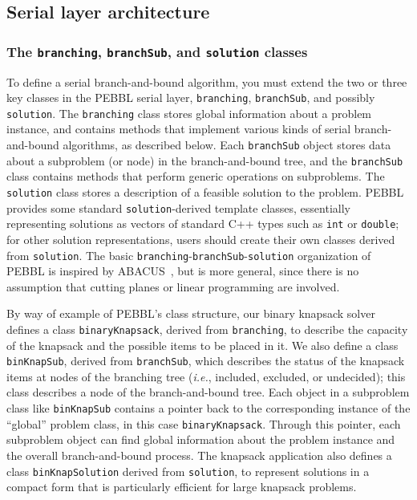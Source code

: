 \subsection{Serial layer architecture}

\subsubsection{The \texttt{branching}, \texttt{branchSub}, 
               and \texttt{solution} classes}

To define a serial branch-and-bound algorithm, you must extend the two
or three key classes in the PEBBL serial layer, \texttt{branching},
\texttt{branchSub}, and possibly \texttt{solution}.  The
\texttt{branching} class stores global information about a problem
instance, and contains methods that implement various kinds of serial
branch-and-bound algorithms, as described below.  Each
\texttt{branchSub} object stores data about a subproblem (or node) in the
branch-and-bound tree, and the \texttt{branchSub} class contains
methods that perform generic operations on subproblems.  The
\texttt{solution} class stores a description of a feasible solution to
the problem.  PEBBL provides some standard \texttt{solution}-derived
template classes, essentially representing solutions as vectors of
standard C++ types such as \texttt{int} or \texttt{double}; for other
solution representations, users should create their own classes
derived from \texttt{solution}.  The basic
\texttt{branching}-\texttt{branchSub}-\texttt{solution} organization
of PEBBL is inspired by ABACUS~\cite{JT98}, but is more general, since
there is no assumption that cutting planes or linear programming are
involved.

By way of example of PEBBL's class structure,
our binary knapsack solver defines a class 
\texttt{binaryKnapsack}, derived from \texttt{branching}, to describe the
capacity of the knapsack and the possible items to be placed in it. We
also define a class \texttt{binKnapSub}, derived from
\texttt{branchSub}, which describes the status of the knapsack items
at nodes of the branching tree (\emph{i.e.}, included, excluded, or
undecided); this class describes a node of the branch-and-bound tree.
Each object in a subproblem class like \texttt{binKnapSub} contains a
pointer back to the corresponding instance of the ``global'' problem
class, in this case \texttt{binaryKnapsack}.  Through this pointer,
each subproblem object can find global information about the problem
instance and the overall
branch-and-bound process.  The knapsack application also defines a
class \texttt{binKnapSolution} derived from \texttt{solution}, to
represent solutions in a compact form that is particularly efficient
for large knapsack problems.

